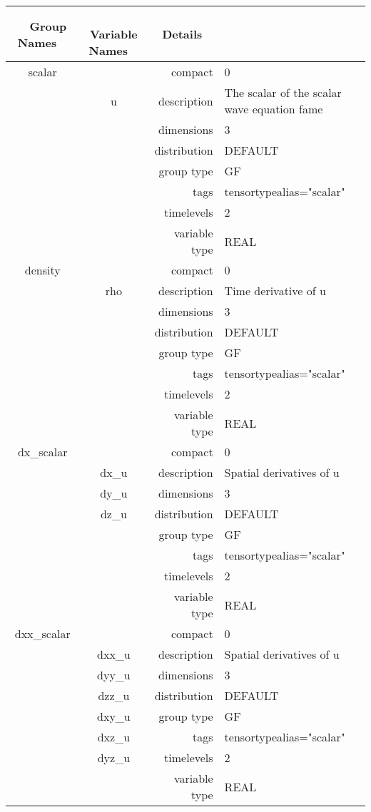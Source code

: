\begin{tabular*}{150mm}{|c|c@{\extracolsep{\fill}}|rl|} \hline 
~ {\bf Group Names} ~ & ~ {\bf Variable Names} ~  &{\bf Details} ~ & ~\\ 
\hline 
scalar &  & compact & 0 \\ 
 & u & description & The scalar of the scalar wave equation fame \\ 
 &  & dimensions & 3 \\ 
 &  & distribution & DEFAULT \\ 
 &  & group type & GF \\ 
 &  & tags & tensortypealias="scalar" \\ 
 &  & timelevels & 2 \\ 
 &  & variable type & REAL \\ 
\hline 
density &  & compact & 0 \\ 
 & rho & description & Time derivative of u \\ 
 &  & dimensions & 3 \\ 
 &  & distribution & DEFAULT \\ 
 &  & group type & GF \\ 
 &  & tags & tensortypealias="scalar" \\ 
 &  & timelevels & 2 \\ 
 &  & variable type & REAL \\ 
\hline 
dx\_scalar &  & compact & 0 \\ 
 & dx\_u & description & Spatial derivatives of u \\ 
 & dy\_u & dimensions & 3 \\ 
 & dz\_u & distribution & DEFAULT \\ 
 &  & group type & GF \\ 
 &  & tags & tensortypealias="scalar" \\ 
 &  & timelevels & 2 \\ 
 &  & variable type & REAL \\ 
\hline 
dxx\_scalar &  & compact & 0 \\ 
 & dxx\_u & description & Spatial derivatives of u \\ 
 & dyy\_u & dimensions & 3 \\ 
 & dzz\_u & distribution & DEFAULT \\ 
 & dxy\_u & group type & GF \\ 
 & dxz\_u & tags & tensortypealias="scalar" \\ 
 & dyz\_u & timelevels & 2 \\ 
 &  & variable type & REAL \\ 

\end{tabular*}
